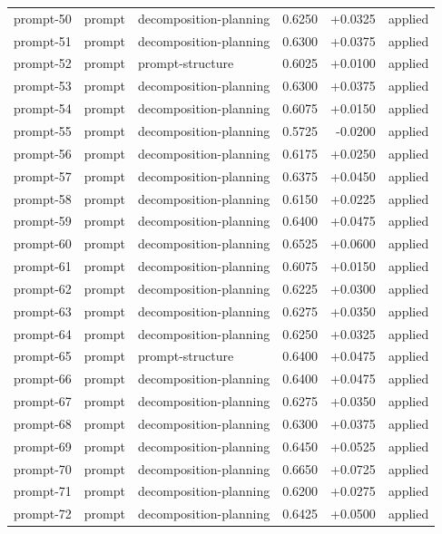 \begin{center}
\begin{longtable}{llp{5.2cm}rrl}
prompt-50 & prompt & decomposition-planning & 0.6250 & +0.0325 & applied \\
prompt-51 & prompt & decomposition-planning & 0.6300 & +0.0375 & applied \\
prompt-52 & prompt & prompt-structure & 0.6025 & +0.0100 & applied \\
prompt-53 & prompt & decomposition-planning & 0.6300 & +0.0375 & applied \\
prompt-54 & prompt & decomposition-planning & 0.6075 & +0.0150 & applied \\
prompt-55 & prompt & decomposition-planning & 0.5725 & -0.0200 & applied \\
prompt-56 & prompt & decomposition-planning & 0.6175 & +0.0250 & applied \\
prompt-57 & prompt & decomposition-planning & 0.6375 & +0.0450 & applied \\
prompt-58 & prompt & decomposition-planning & 0.6150 & +0.0225 & applied \\
prompt-59 & prompt & decomposition-planning & 0.6400 & +0.0475 & applied \\
prompt-60 & prompt & decomposition-planning & 0.6525 & +0.0600 & applied \\
prompt-61 & prompt & decomposition-planning & 0.6075 & +0.0150 & applied \\
prompt-62 & prompt & decomposition-planning & 0.6225 & +0.0300 & applied \\
prompt-63 & prompt & decomposition-planning & 0.6275 & +0.0350 & applied \\
prompt-64 & prompt & decomposition-planning & 0.6250 & +0.0325 & applied \\
prompt-65 & prompt & prompt-structure & 0.6400 & +0.0475 & applied \\
prompt-66 & prompt & decomposition-planning & 0.6400 & +0.0475 & applied \\
prompt-67 & prompt & decomposition-planning & 0.6275 & +0.0350 & applied \\
prompt-68 & prompt & decomposition-planning & 0.6300 & +0.0375 & applied \\
prompt-69 & prompt & decomposition-planning & 0.6450 & +0.0525 & applied \\
prompt-70 & prompt & decomposition-planning & 0.6650 & +0.0725 & applied \\
prompt-71 & prompt & decomposition-planning & 0.6200 & +0.0275 & applied \\
prompt-72 & prompt & decomposition-planning & 0.6425 & +0.0500 & applied \\

\end{longtable}
\end{center}
